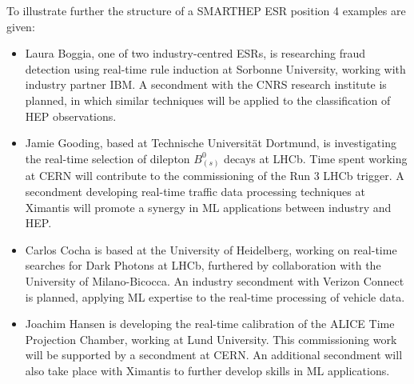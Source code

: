 To illustrate further the structure of a SMARTHEP ESR position 4 examples are given:
\begin{itemize}
    \item  Laura Boggia, one of two industry-centred ESRs, is researching fraud detection using real-time rule induction at Sorbonne University, working with industry partner IBM. A secondment with the CNRS research institute is planned, in which similar techniques will be applied to the classification of HEP observations.
    \item Jamie Gooding, based at Technische Universit\"at Dortmund, is investigating the real-time selection of dilepton $B_{(s)}^0$ decays at LHCb. Time spent working at CERN will contribute to the commissioning of the Run 3 LHCb trigger. A secondment developing real-time traffic data processing techniques at Ximantis will promote a synergy in ML applications between industry and HEP.
    \item Carlos Cocha is based at the University of Heidelberg, working on real-time searches for Dark Photons at LHCb, furthered by collaboration with the University of Milano-Bicocca. An industry secondment with Verizon Connect is planned, applying ML expertise to the real-time processing of vehicle data.
    \item Joachim Hansen is developing the real-time calibration of the ALICE Time Projection Chamber, working at Lund University. This commissioning work will be supported by a secondment at CERN. An additional secondment will also take place with Ximantis to further develop skills in ML applications.
\end{itemize}